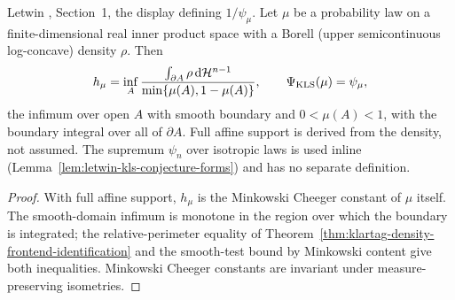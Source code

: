 \begin{lemma}
  \label{lem:letwin-smooth-boundary-isoperimetry}
  \leanok
  Letwin \cite{Letwin2026QuadraticKLS}, Section~1, the display defining $1/\psi_\mu$. Let $\mu$ be a probability law on
  a finite-dimensional real inner product space with a Borell (upper semicontinuous log-concave) density $\rho$. Then
  \[
    h_\mu=\inf_{A}\frac{\int_{\partial A}\rho\,\mathrm d\mathcal H^{n-1}}{\min\{\mu(A),1-\mu(A)\}},
    \qquad
    \Psi_{\mathrm{KLS}}(\mu)=\psi_\mu,
  \]
  the infimum over open $A$ with smooth boundary and $0<\mu(A)<1$, with the boundary integral over all of $\partial A$.
  Full affine support is derived from the density, not assumed. The supremum $\psi_n$ over isotropic laws is used
  inline (Lemma~\ref{lem:letwin-kls-conjecture-forms}) and has no separate definition.
\end{lemma}
\begin{proof}
  \leanok
  With full affine support, $h_\mu$ is the Minkowski Cheeger constant of $\mu$ itself. The smooth-domain infimum is
  monotone in the region over which the boundary is integrated; the relative-perimeter equality of
  Theorem~\ref{thm:klartag-density-frontend-identification} and the smooth-test bound by Minkowski content give both
  inequalities. Minkowski Cheeger constants are invariant under measure-preserving isometries.
\end{proof}

